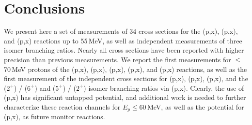 




 
 \section{\label{sec:conclusions_fe}Conclusions}
 

We present here a set of measurements of 34 cross sections for the (p,x), (p,x), and  (p,x) reactions up to 55\,MeV, as well as  independent measurements of three isomer branching ratios.
Nearly all cross sections have been reported with higher precision than previous measurements.
We report the first measurements  for $\leq$70\,MeV protons  of the  (p,x), (p,x), (p,x),  (p,x), and (p,x) reactions, as well as the first measurement of the independent cross sections for    (p,x), (p,x), (p,x), and the  ($2^+$) /   ($6^+$) and  ($5^+$) /   ($2^+$)  isomer branching ratios via (p,x).
Clearly, the use of (p,x) has significant untapped potential, and additional work is needed to further characterize these reaction channels for $E_p \leq$60\,MeV, as well as the potential for (p,x), as future monitor reactions.

